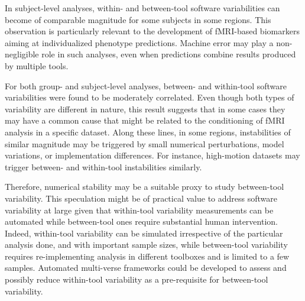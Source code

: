 \documentclass[11pt,onecolumn]{article}
\begin{document}
In subject-level analyses, within- and between-tool software variabilities can become
of comparable magnitude for some subjects in some regions. This observation
is particularly relevant to the development of fMRI-based biomarkers aiming
at individualized phenotype predictions. Machine error may play
a non-negligible role in such analyses, even when predictions combine
results produced by multiple tools.

For both group- and subject-level analyses, between- and within-tool
software variabilities were found to be moderately correlated. Even though
both types of variability are different in nature, this result suggests
that in some cases they may have a common cause that might be related to
the conditioning of fMRI analysis in a specific dataset. Along these lines,
in some regions, instabilities of similar magnitude may be triggered by
small numerical perturbations, model variations, or implementation
differences. For instance, high-motion datasets may trigger between- and
within-tool instabilities similarly. 

Therefore, numerical stability may be a suitable proxy to study
between-tool variability. This speculation might be of practical value to
address software variability at large given that within-tool variability
measurements can be automated while between-tool ones require substantial
human intervention. Indeed, within-tool variability can be simulated
irrespective of the particular analysis done, and with important sample
sizes, while between-tool variability requires re-implementing analysis in
different toolboxes and is limited to a few samples. Automated multi-verse
frameworks could be developed to assess and possibly reduce within-tool
variability as a pre-requisite for between-tool variability.

\end{document}
